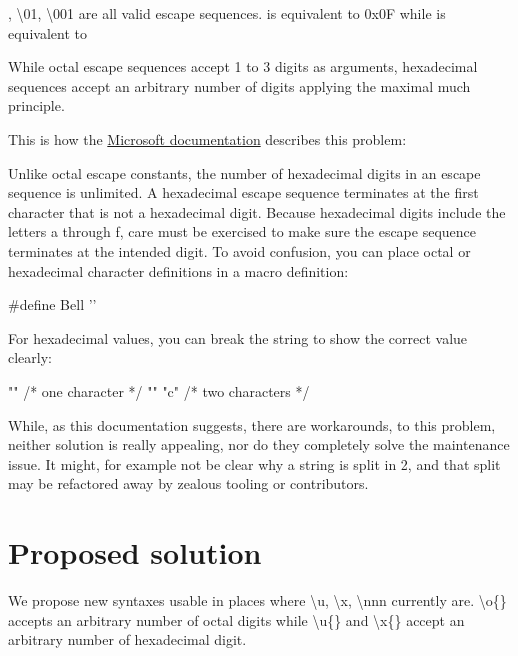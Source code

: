 \documentclass{wg21}
\begin{document}
, {\textbackslash 01}, {\textbackslash 001} are all valid escape sequences.
 is equivalent to 0x0F while  is equivalent to 

While octal escape sequences accept 1 to 3 digits as arguments, hexadecimal sequences accept an arbitrary number of digits
applying the maximal much principle.


This is how the \href{https://docs.microsoft.com/en-us/cpp/c-language/octal-and-hexadecimal-character-specifications?view=msvc-160}{Microsoft documentation} describes this problem:

\begin{quoteblock}
    
    Unlike octal escape constants, the number of hexadecimal digits in an escape sequence is unlimited. A hexadecimal escape sequence terminates at the first character that is not a hexadecimal digit. Because hexadecimal digits include the letters a through f, care must be exercised to make sure the escape sequence terminates at the intended digit. To avoid confusion, you can place octal or hexadecimal character definitions in a macro definition:
    
    \begin{colorblock}
        #define Bell ''
    \end{colorblock}
    
    For hexadecimal values, you can break the string to show the correct value clearly:
    
    \begin{colorblock}
        "\xabc"    /* one character  */
        "\xab" "c" /* two characters */
    \end{colorblock}
    
\end{quoteblock}

While, as this documentation suggests, there are workarounds, to this problem, neither solution is really appealing, nor do
they completely solve the maintenance issue. It might, for example not be clear why a string is split in 2, and that split may
be refactored away by zealous tooling or contributors.

\section{Proposed solution}

We propose new syntaxes  usable in places where
\textbackslash u, \textbackslash x, \textbackslash nnn currently are.
\textbackslash o\{\} accepts an arbitrary number of octal digits while \textbackslash u\{\} and \textbackslash x\{\} accept
an arbitrary number of hexadecimal digit.
\end{document}
